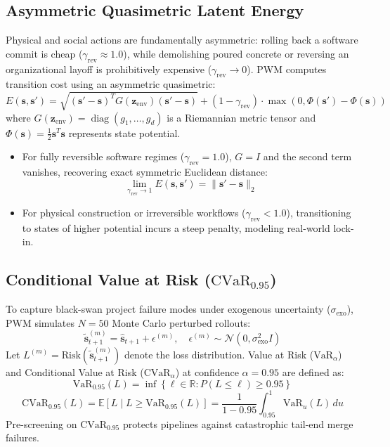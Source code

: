 \documentclass[11pt,a4paper]{article}
\begin{document}
\subsection{Asymmetric Quasimetric Latent Energy}
Physical and social actions are fundamentally asymmetric: rolling back a software commit is cheap ($\gamma_{\text{rev}} \approx 1.0$), while demolishing poured concrete or reversing an organizational layoff is prohibitively expensive ($\gamma_{\text{rev}} \to 0$). PWM computes transition cost using an asymmetric quasimetric:
\begin{equation}
    E(\mathbf{s}, \mathbf{s}') = \sqrt{(\mathbf{s}'-\mathbf{s})^T G(\mathbf{z}_{\text{env}}) (\mathbf{s}'-\mathbf{s})} + (1 - \gamma_{\text{rev}}) \cdot \max\left(0, \Phi(\mathbf{s}') - \Phi(\mathbf{s})\right)
\end{equation}
where $G(\mathbf{z}_{\text{env}}) = \operatorname{diag}(g_1, \dots, g_d)$ is a Riemannian metric tensor and $\Phi(\mathbf{s}) = \frac{1}{2} \mathbf{s}^T \mathbf{s}$ represents state potential. 
\begin{itemize}
    \item For fully reversible software regimes ($\gamma_{\text{rev}} = 1.0$), $G = I$ and the second term vanishes, recovering exact symmetric Euclidean distance:
    \begin{equation}
        \lim_{\gamma_{\text{rev}} \to 1} E(\mathbf{s}, \mathbf{s}') = \|\mathbf{s}' - \mathbf{s}\|_2
    \end{equation}
    \item For physical construction or irreversible workflows ($\gamma_{\text{rev}} < 1.0$), transitioning to states of higher potential incurs a steep penalty, modeling real-world lock-in.
\end{itemize}

\subsection{Conditional Value at Risk ($\text{CVaR}_{0.95}$)}
To capture black-swan project failure modes under exogenous uncertainty ($\sigma_{\text{exo}}$), PWM simulates $N=50$ Monte Carlo perturbed rollouts:
\begin{equation}
    \tilde{\mathbf{s}}_{t+1}^{(m)} = \hat{\mathbf{s}}_{t+1} + \epsilon^{(m)}, \quad \epsilon^{(m)} \sim \mathcal{N}\left(0, \sigma_{\text{exo}}^2 I\right)
\end{equation}
Let $L^{(m)} = \text{Risk}(\tilde{\mathbf{s}}_{t+1}^{(m)})$ denote the loss distribution. Value at Risk ($\text{VaR}_\alpha$) and Conditional Value at Risk ($\text{CVaR}_\alpha$) at confidence $\alpha = 0.95$ are defined as:
\begin{equation}
    \text{VaR}_{0.95}(L) = \inf \left\{ \ell \in \mathbb{R} : P(L \le \ell) \ge 0.95 \right\}
\end{equation}
\begin{equation}
    \text{CVaR}_{0.95}(L) = \mathbb{E}\left[ L \mid L \ge \text{VaR}_{0.95}(L) \right] = \frac{1}{1 - 0.95} \int_{0.95}^1 \text{VaR}_u(L) \, du
\end{equation}
Pre-screening on $\text{CVaR}_{0.95}$ protects pipelines against catastrophic tail-end merge failures.
\end{document}
